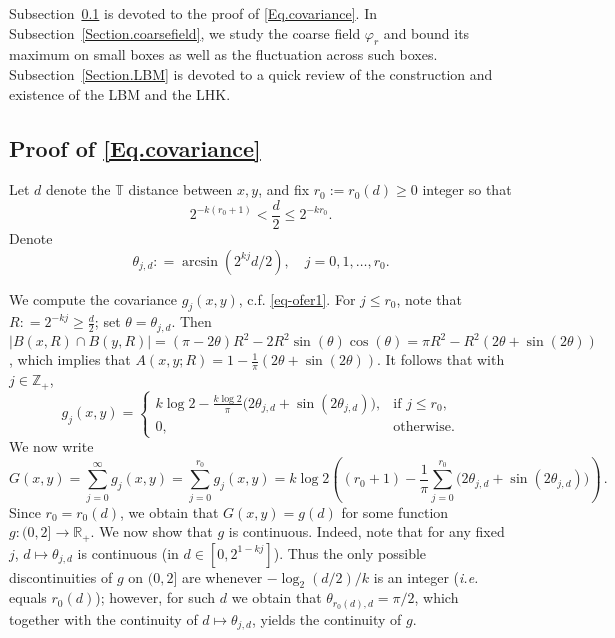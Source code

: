 \documentclass[11pt]{article}
\theoremstyle{definition}
\def \R {{\mathbb{R}}}
\def \T {{\mathbb{T}}}
\def \Z {{\mathbb{Z}}}
\begin{document}
Subsection~\ref{Section.covariance} is devoted to
the proof of \eqref{Eq.covariance}. In Subsection~\ref{Section.coarsefield},
we study  the coarse field $\varphi_r$ and bound its maximum on small boxes
as well as the fluctuation across such boxes.
Subsection~\ref{Section.LBM} is devoted to a quick review of the
construction and existence of the LBM and the LHK.

\subsection{Proof of \eqref{Eq.covariance}} \label{Section.covariance}
Let $d$ denote the $\T$ distance between $x,y$, and fix
$r_0 := r_0 (d) \ge 0$ integer
so that
 $$ 2^{- k (r_0 + 1)} < \frac d 2 \le 2^{- k r_0 } .
 $$
Denote
 $$
\theta_{j , d} : =
\arcsin(2^{kj} d/2), \quad j=0,1,\ldots, r_0. 
 $$

We compute the covariance $g_j (x,y)$, c.f. \eqref{eq-ofer1}. For $j\leq r_0$, note that
$R: = 2^{- k j} \ge \frac d 2$; set $\theta=\theta_{j,d}$. Then $|B(x,R) \cap B(y,R)| = (\pi - 2 \theta) R^2 - 2 R^2 \sin (\theta) \cos (\theta) = \pi R^2 - R^2 (2 \theta + \sin (2 \theta))$, which implies that $A(x,y; R) = 1 - \frac 1  {\pi} (2 \theta + \sin (2 \theta) )$. It follows that with $j\in \Z_+$,
 \begin{equation} \label{Eq.COVcovhj}
g_j (x,y) = \left\{ \begin{array}{ll}  k \log 2 - \frac {k \log 2} \pi
  \big( 2 \theta_{j , d} +  \sin (2 \theta_{j , d} ) \big),
  & \mbox{if } j \le r_0,  \\ 0, & \mbox{otherwise.} \end{array} \right.
 \end{equation}
We now write
\begin{equation}
  \label{eq-ofer2}
  G(x,y)=\sum_{j=0}^\infty g_j(x,y)=\sum_{j=0}^{r_0} g_j(x,y)=
k\log 2\left( (r_0+1)-\frac1\pi \sum_{j=0}^{r_0} \big( 2\theta_{j,d}+
\sin(2\theta_{j,d}) \big)\right)\,.
\end{equation}
Since $r_0=r_0(d)$, we obtain that $G(x,y)=g(d)$ for some function $g:(0,2]
\to \R_+$. We now show that $g$ is continuous. Indeed, note that for any fixed
$j$,   $d\mapsto  \theta_{j,d}$ is continuous (in $d \in [0, 2^{1-kj}]$). Thus the only possible discontinuities of $g$ on $(0,2]$ are whenever $-\log_2(d/2)/k$ is an integer ({\em i.e.} equals $r_0(d)$); however, for such
$d$ we obtain that $\theta_{r_0(d),d}=\pi/2$, which together with the continuity of $d\mapsto \theta_{j,d}$, yields the continuity of $g$.
\end{document}

